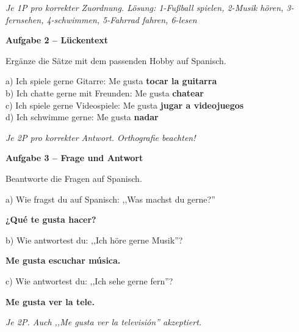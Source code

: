 \documentclass[11pt, a4paper]{article}
\newcommand{\fachfarbe}{spanisch}
\newcommand{\punktebox}[1]{\hfill\fbox{\small \_/#1}}
\newcommand{\lsg}[1]{\textcolor{loesung}{\textbf{#1}}}
\newenvironment{aufgabe}[1]{%
    \needspace{5\baselineskip}%
    \nopagebreak[4]%
    \vspace{10pt}
    \noindent\textbf{\textcolor{\fachfarbe}{Aufgabe #1}}
    \nopagebreak[4]%
    \vspace{5pt}
    \nopagebreak[4]%
    \begin{list}{}{\leftmargin=0pt}
    \item[]
}{%
    \end{list}
}
\begin{document}
\textit{\textcolor{grau}{Je 1P pro korrekter Zuordnung. Lösung: 1-Fußball spielen, 2-Musik hören, 3-fernsehen, 4-schwimmen, 5-Fahrrad fahren, 6-lesen}}

\vspace{15pt}


\begin{aufgabe}{2 -- Lückentext}
Ergänze die Sätze mit dem passenden Hobby auf Spanisch. \punktebox{8}
\end{aufgabe}

\noindent
a) Ich spiele gerne Gitarre: Me gusta \lsg{tocar la guitarra}\\[1em]
b) Ich chatte gerne mit Freunden: Me gusta \lsg{chatear}\\[1em]
c) Ich spiele gerne Videospiele: Me gusta \lsg{jugar a videojuegos}\\[1em]
d) Ich schwimme gerne: Me gusta \lsg{nadar}

\textit{\textcolor{grau}{Je 2P pro korrekter Antwort. Orthografie beachten!}}

\vspace{15pt}


\begin{aufgabe}{3 -- Frage und Antwort}
Beantworte die Fragen auf Spanisch. \punktebox{6}
\end{aufgabe}

\noindent
a) Wie fragst du auf Spanisch: ,,Was machst du gerne?''

\lsg{¿Qué te gusta hacer?}

\vspace{1em}

\noindent
b) Wie antwortest du: ,,Ich höre gerne Musik''?

\lsg{Me gusta escuchar música.}

\vspace{1em}

\noindent
c) Wie antwortest du: ,,Ich sehe gerne fern''?

\lsg{Me gusta ver la tele.}

\textit{\textcolor{grau}{Je 2P. Auch ,,Me gusta ver la televisión'' akzeptiert.}}
\end{document}
